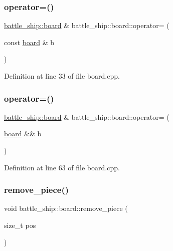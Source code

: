 \subsubsection{\texorpdfstring{operator=()}{operator=()}\hspace{0.1cm}{\footnotesize\ttfamily [1/2]}}
{\footnotesize\ttfamily \hyperlink{classbattle__ship_1_1board}{battle\+\_\+ship\+::board} \& battle\+\_\+ship\+::board\+::operator= (\begin{DoxyParamCaption}\item[{const \hyperlink{classbattle__ship_1_1board}{board} \&}]{b }\end{DoxyParamCaption})}



Definition at line 33 of file board.\+cpp.

\mbox{\label{classbattle__ship_1_1board_ae6dc011dea24157e59e2b3a6f34af586}} 
\subsubsection{\texorpdfstring{operator=()}{operator=()}\hspace{0.1cm}{\footnotesize\ttfamily [2/2]}}
{\footnotesize\ttfamily \hyperlink{classbattle__ship_1_1board}{battle\+\_\+ship\+::board} \& battle\+\_\+ship\+::board\+::operator= (\begin{DoxyParamCaption}\item[{\hyperlink{classbattle__ship_1_1board}{board} \&\&}]{b }\end{DoxyParamCaption})}



Definition at line 63 of file board.\+cpp.

\mbox{\label{classbattle__ship_1_1board_a19d236125f444778e5789109d9c1093b}} 
\subsubsection{\texorpdfstring{remove\+\_\+piece()}{remove\_piece()}}
{\footnotesize\ttfamily void battle\+\_\+ship\+::board\+::remove\+\_\+piece (\begin{DoxyParamCaption}\item[{size\+\_\+t}]{pos }\end{DoxyParamCaption})}



